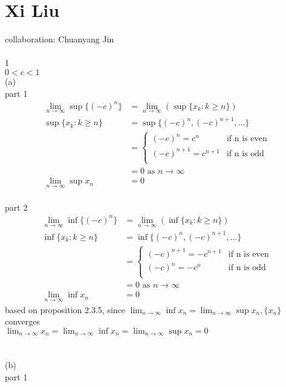 \documentclass[12pt, border = 4pt, multi]{article} %
\begin{document}
\section*{Xi Liu}
collaboration: Chuanyang Jin\\
\\
1\\
$0 < c < 1$\\
(a)\\
part 1
\begin{align*}
\lim_{n \rightarrow \infty} \sup \{(-c) ^ n\} &= \lim_{n \rightarrow \infty}(\sup\{x_k: k \geq n\})\\
\sup\{x_k: k \geq n\} &= \sup\{(-c) ^ n, (-c) ^ {n + 1}, ...\}\\
&=
\begin{cases}
(-c) ^ n = c ^ n & \text{if n is even}\\
(-c) ^ {n + 1} = c ^ {n + 1} & \text{if n is odd}\\
\end{cases}\\
&= 0 \text{ as } n \rightarrow \infty\\
\lim_{n \rightarrow \infty} \sup x_n &= 0
\end{align*}
\\
part 2
\begin{align*}
\lim_{n \rightarrow \infty} \inf \{(-c) ^ n\} &= \lim_{n \rightarrow \infty}(\inf\{x_k: k \geq n\})\\
\inf\{x_k: k \geq n\} &= \inf\{(-c) ^ n, (-c) ^ {n + 1}, ...\}\\
&=
\begin{cases}
(-c) ^ {n + 1} = -c ^ {n + 1} & \text{if n is even}\\
(-c) ^ n = -c ^ n & \text{if n is odd}\\
\end{cases}\\
&= 0 \text{ as } n \rightarrow \infty\\
\lim_{n \rightarrow \infty} \inf x_n &= 0
\end{align*}
based on proposition 2.3.5, since $\lim_{n \rightarrow \infty} \inf x_n = \lim_{n \rightarrow \infty} \sup x_n, \{x_n\}$ converges\\
$\lim_{n \rightarrow \infty} x_n = \lim_{n \rightarrow \infty} \inf x_n = \lim_{n \rightarrow \infty} \sup x_n = 0$\\
\\
\\
(b)\\
part 1
\end{document}

